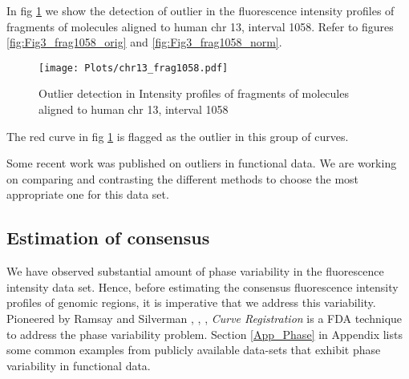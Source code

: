 In fig \ref{fig:Fig3_frag1058_outlier} we show the detection of outlier in the fluorescence intensity profiles of fragments of molecules aligned to human chr 13, interval 1058. Refer to figures \ref{fig:Fig3_frag1058_orig} and \ref{fig:Fig3_frag1058_norm}. 
\begin{figure}[H]
\begin{center}
\texttt{[image: Plots/chr13\_frag1058.pdf]}
\end{center}
\caption{Outlier detection in Intensity profiles of fragments of molecules aligned to human chr 13, interval 1058}
\label{fig:Fig3_frag1058_outlier}
\end{figure}
The red curve in fig \ref{fig:Fig3_frag1058_outlier} is flagged as the outlier in this group of curves.
\begin{tcolorbox}[colback=green!5,colframe=green!40!black,title=Work in progress] %
Some recent work was published on outliers in functional data. We are working on comparing and contrasting the different methods to choose the most appropriate one for this data set.
\end{tcolorbox}

\subsection{Estimation of consensus} \label{Ch3_Regist}

We have observed substantial amount of phase variability in the fluorescence intensity data set. Hence, before estimating the consensus fluorescence intensity profiles of genomic regions, it is imperative that we address this variability. Pioneered by Ramsay and Silverman \cite{Ramsay_2006_Functional}, \cite{Ramsay_Li_1998_JRSSB}, \cite{Ramsay_etal_2009_Functional_R}, {\emph{Curve Registration}} is a FDA technique to address the phase variability problem. Section \ref{App_Phase} in Appendix lists some common examples from publicly available data-sets that exhibit phase variability in functional data.

